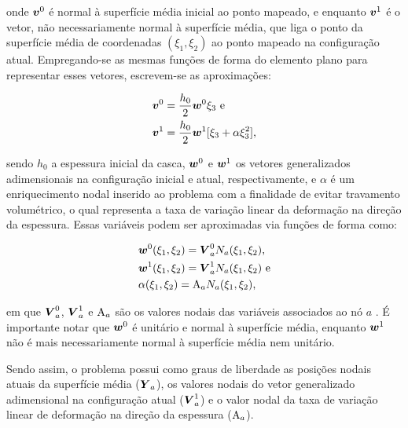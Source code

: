 \noindent onde $\boldsymbol{v}^0$ é normal à superfície média inicial ao ponto mapeado, e enquanto $\boldsymbol{v}^1$ é o vetor, não necessariamente normal à superfície média, que liga o ponto da superfície média de coordenadas $(\xi_1,\xi_2)$ ao ponto mapeado na configuração atual. Empregando-se as mesmas funções de forma do elemento plano para representar esses vetores, escrevem-se as aproximações:

\begin{subequations}
    \begin{align}
         & \boldsymbol{v}^0=\frac{h_0}{2}\boldsymbol{w}^0\xi_3\text{ e}                \\
         & \boldsymbol{v}^1=\frac{h_0}{2}\boldsymbol{w}^1[\xi_3+\alpha\xi_3^2]\text{,}
    \end{align}
\end{subequations}

\noindent sendo $h_0$ a espessura inicial da casca, $\boldsymbol{w}^0$ e $\boldsymbol{w}^1$ os vetores generalizados adimensionais na configuração inicial e atual, respectivamente, e $\alpha$ é um enriquecimento nodal inserido ao problema com a finalidade de evitar travamento volumétrico, o qual representa a taxa de variação linear da deformação na direção da espessura. Essas variáveis podem ser aproximadas via funções de forma como:

\begin{subequations}
    \begin{align}
         & \boldsymbol{w}^0(\xi_1,\xi_2)=\boldsymbol{V}^0_aN_a(\xi_1,\xi_2)\text{,}  \\
         & \boldsymbol{w}^1(\xi_1,\xi_2)=\boldsymbol{V}^1_aN_a(\xi_1,\xi_2)\text{ e} \\
         & \alpha(\xi_1,\xi_2)=\mathrm{A}_aN_a(\xi_1,\xi_2)\text{,}
    \end{align}
\end{subequations}

\noindent em que $\boldsymbol{V}^0_a$, $\boldsymbol{V}^1_a$ e $\mathrm{A}_a$ são os valores nodais das variáveis associados ao nó $a$ \cite{sanches2013unconstrained,sanches2014fluid}. É importante notar que $\boldsymbol{w}^0$ é unitário e normal à superfície média, enquanto $\boldsymbol{w}^1$ não é mais necessariamente normal à superfície média nem unitário.

Sendo assim, o problema possui como graus de liberdade as posições nodais atuais da superfície média ($\boldsymbol{Y}_a$), os valores nodais do vetor generalizado adimensional na configuração atual ($\boldsymbol{V}^1_a$) e o valor nodal da taxa de variação linear de deformação na direção da espessura ($\mathrm{A}_a$).

